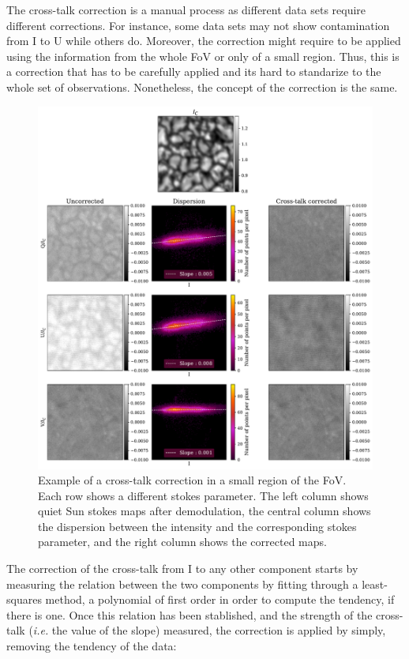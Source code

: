 The cross-talk correction is a manual process as different data sets require different corrections. For instance, some data sets may not show contamination from I to U while others do. Moreover, the correction might require to be applied using the information from the whole FoV or only of a small region. Thus, this is a correction that has to be carefully applied and its hard to standarize to the whole set of observations. Nonetheless, the concept of the correction is the same. 

\begin{figure}[ht]
  \includegraphics[width=\textwidth]{figures/Pipeline/xtalk_example.pdf}
  \caption{Example of a cross-talk correction in a small region of the FoV. Each row shows a different stokes parameter. The left column shows quiet Sun stokes maps after demodulation, the central column shows the dispersion between the intensity and the corresponding stokes parameter, and the right column shows the corrected maps. }
    \label{fig_pipeline: xtalk}
\end{figure}

The correction of the cross-talk from I to any other component starts by measuring the relation between the two components by fitting through a least-squares method, a polynomial of first order in order to compute the tendency, if there is one. Once this relation has been stablished, and the strength of the cross-talk (\textit{i.e.} the value of the slope) measured, the correction is applied by simply, removing the tendency of the data: 

